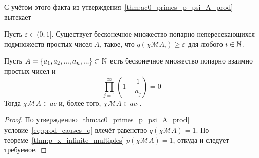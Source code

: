 С учётом этого факта
из утверждения~\ref{thm:ac0_primes_p_psi_A_prod} вытекает
\begin{corollary}
	\label{lem:q_x_infinite_Euler}
	Пусть $\varepsilon \in  (0; 1{]}$.
	Существует бесконечное множество попарно непересекающихся подмножеств простых чисел
	$A_i$ такое, что $q(\chi\mathscr{M}A_i)\geq\varepsilon$ для любого $i\in\mathbb{N}$.
\end{corollary}



\begin{corollary}
	Пусть $A=\{a_1, a_2, ..., a_n, ...\}\subset\mathbb{N}$ есть бесконечное множество попарно взаимно простых чисел
	и
	\begin{equation}
		\label{eq:prod_causes_q}
		\prod_{j=1}^\infty \left(1-\frac{1}{a_j}\right) = 0
	\end{equation}
	Тогда $\chi\mathscr{M}A\in ac$ и, более того, $\chi\mathscr{M}A\in ac_1$.
\end{corollary}

\begin{proof}
	По утверждению~\ref{thm:ac0_primes_p_psi_A_prod} условие~\eqref{eq:prod_causes_q} влечёт равенство $q(\chi\mathscr{M}A)=1$.
	По теореме~\ref{thm:p_x_infinite_multiples} $p(\chi\mathscr{M}A)=1$,
	откуда и следует требуемое.
\end{proof}
